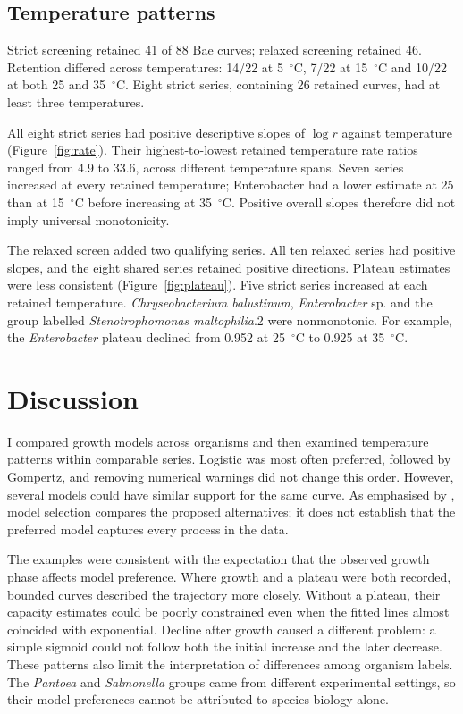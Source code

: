 \documentclass[11pt,a4paper]{article}
\begin{document}
\subsection{Temperature patterns}
Strict screening retained 41 of 88 Bae curves; relaxed screening retained 46. Retention differed across temperatures: 14/22 at 5~$^\circ$C, 7/22 at 15~$^\circ$C and 10/22 at both 25 and 35~$^\circ$C. Eight strict series, containing 26 retained curves, had at least three temperatures.

All eight strict series had positive descriptive slopes of $\log r$ against temperature (Figure~\ref{fig:rate}). Their highest-to-lowest retained temperature rate ratios ranged from 4.9 to 33.6, across different temperature spans. Seven series increased at every retained temperature; Enterobacter had a lower estimate at 25 than at 15~$^\circ$C before increasing at 35~$^\circ$C. Positive overall slopes therefore did not imply universal monotonicity.

The relaxed screen added two qualifying series. All ten relaxed series had positive slopes, and the eight shared series retained positive directions. Plateau estimates were less consistent (Figure~\ref{fig:plateau}). Five strict series increased at each retained temperature. \textit{Chryseobacterium balustinum}, \textit{Enterobacter} sp. and the group labelled \textit{Stenotrophomonas maltophilia}.2 were nonmonotonic. For example, the \textit{Enterobacter} plateau declined from 0.952 at 25~$^\circ$C to 0.925 at 35~$^\circ$C.

\section{Discussion}
I compared growth models across organisms and then examined temperature patterns within comparable series. Logistic was most often preferred, followed by Gompertz, and removing numerical warnings did not change this order. However, several models could have similar support for the same curve. As emphasised by \citet{Johnson2004}, model selection compares the proposed alternatives; it does not establish that the preferred model captures every process in the data.

The examples were consistent with the expectation that the observed growth phase affects model preference. Where growth and a plateau were both recorded, bounded curves described the trajectory more closely. Without a plateau, their capacity estimates could be poorly constrained even when the fitted lines almost coincided with exponential. Decline after growth caused a different problem: a simple sigmoid could not follow both the initial increase and the later decrease. These patterns also limit the interpretation of differences among organism labels. The \textit{Pantoea} and \textit{Salmonella} groups came from different experimental settings, so their model preferences cannot be attributed to species biology alone.
\end{document}
